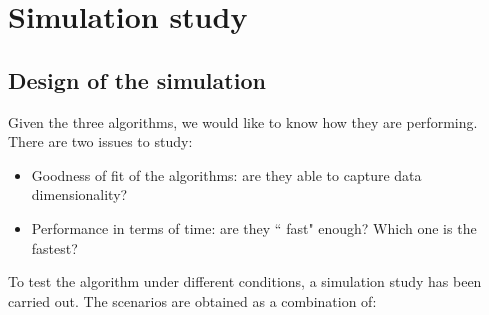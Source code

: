 \documentclass[11pt]{report}
\begin{document}
\chapter{Simulation study}

\section{Design of the simulation}

\label{chap:sim}
Given the three algorithms, we would like to know how they are 
performing. There are two issues to study:

\begin{itemize}
\item Goodness of fit of the algorithms: are they able to capture data
dimensionality?
\item Performance in terms of time: are they `` fast" enough? Which one is 
the fastest?
\end{itemize}

To test the algorithm under different conditions, a simulation study has been
carried out. The scenarios are obtained as a combination of:
\end{document}
